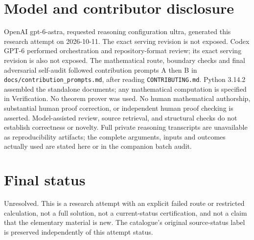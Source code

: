 \documentclass[11pt]{article}
\begin{document}
\section{Model and contributor disclosure}
OpenAI gpt-6-astra, requested reasoning configuration ultra, generated this research
attempt on 2026-10-11. The exact serving revision is not exposed. Codex GPT-6
performed orchestration and repository-format review; its exact serving revision
is also not exposed. The mathematical route, boundary checks and final adversarial
self-audit followed contribution prompts A then B in
\texttt{docs/contribution\_prompts.md}, after reading \texttt{CONTRIBUTING.md}.
Python 3.14.2 assembled the standalone documents; any mathematical computation is
specified in Verification. No theorem prover was used. No human mathematical
authorship, substantial human proof correction, or independent human proof checking
is asserted. Model-assisted review, source retrieval, and structural checks do not
establish correctness or novelty. Full private reasoning transcripts are unavailable
as reproducibility artifacts; the complete arguments, inputs and outcomes actually
used are stated here or in the companion batch audit.
\section{Final status}
Unresolved. This is a research attempt with an explicit failed route or restricted
calculation, not a full solution, not a current-status certification, and not a claim
that the elementary material is new. The catalogue's original source-status label
is preserved independently of this attempt status.
\end{document}
